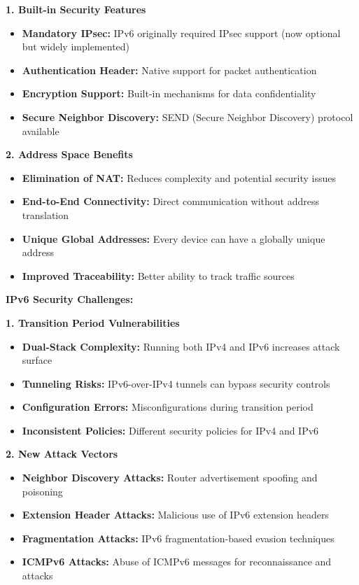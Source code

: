 \documentclass[12pt,a4paper]{article}
\begin{document}
\textbf{1. Built-in Security Features}
\begin{itemize}
    \item \textbf{Mandatory IPsec:} IPv6 originally required IPsec support (now optional but widely implemented)
    \item \textbf{Authentication Header:} Native support for packet authentication
    \item \textbf{Encryption Support:} Built-in mechanisms for data confidentiality
    \item \textbf{Secure Neighbor Discovery:} SEND (Secure Neighbor Discovery) protocol available
\end{itemize}

\textbf{2. Address Space Benefits}
\begin{itemize}
    \item \textbf{Elimination of NAT:} Reduces complexity and potential security issues
    \item \textbf{End-to-End Connectivity:} Direct communication without address translation
    \item \textbf{Unique Global Addresses:} Every device can have a globally unique address
    \item \textbf{Improved Traceability:} Better ability to track traffic sources
\end{itemize}

\textbf{IPv6 Security Challenges:}

\textbf{1. Transition Period Vulnerabilities}
\begin{itemize}
    \item \textbf{Dual-Stack Complexity:} Running both IPv4 and IPv6 increases attack surface
    \item \textbf{Tunneling Risks:} IPv6-over-IPv4 tunnels can bypass security controls
    \item \textbf{Configuration Errors:} Misconfigurations during transition period
    \item \textbf{Inconsistent Policies:} Different security policies for IPv4 and IPv6
\end{itemize}

\textbf{2. New Attack Vectors}
\begin{itemize}
    \item \textbf{Neighbor Discovery Attacks:} Router advertisement spoofing and poisoning
    \item \textbf{Extension Header Attacks:} Malicious use of IPv6 extension headers
    \item \textbf{Fragmentation Attacks:} IPv6 fragmentation-based evasion techniques
    \item \textbf{ICMPv6 Attacks:} Abuse of ICMPv6 messages for reconnaissance and attacks
\end{itemize}
\end{document}
